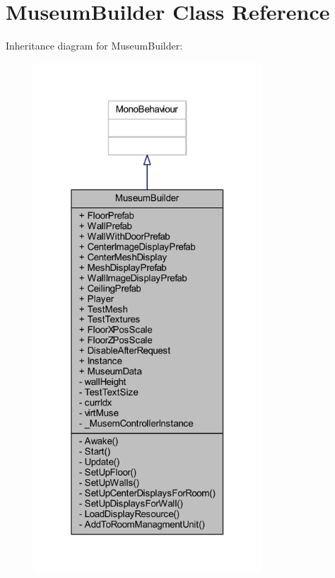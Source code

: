 \hypertarget{class_museum_builder}{}\section{Museum\+Builder Class Reference}
\label{class_museum_builder}


Inheritance diagram for Museum\+Builder\+:
\nopagebreak
\begin{figure}[H]
\begin{center}
\leavevmode
\includegraphics[width=241pt]{class_museum_builder__inherit__graph}
\end{center}
\end{figure}



